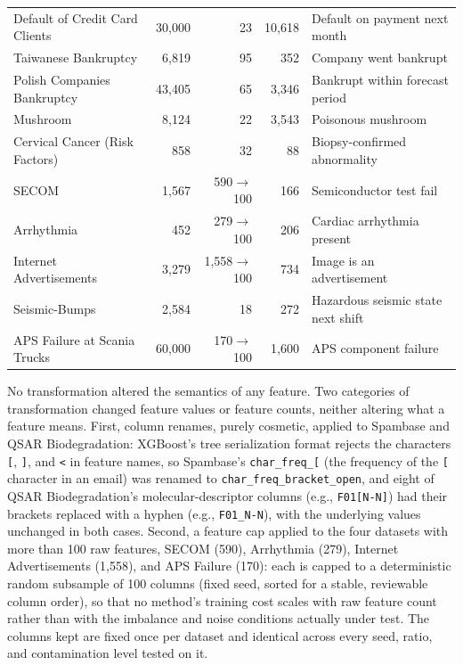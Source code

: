 \begin{table}[t]
\begin{tabular}{@{}lrrrl@{}}
Default of Credit Card Clients & 30{,}000 & 23 & 10{,}618 & Default on payment next month \\
Taiwanese Bankruptcy           & 6{,}819  & 95 & 352    & Company went bankrupt \\
Polish Companies Bankruptcy    & 43{,}405 & 65 & 3{,}346  & Bankrupt within forecast period \\
Mushroom                       & 8{,}124  & 22 & 3{,}543  & Poisonous mushroom \\
Cervical Cancer (Risk Factors) & 858     & 32 & 88     & Biopsy-confirmed abnormality \\
SECOM                          & 1{,}567  & 590$\to$100 & 166 & Semiconductor test fail \\
Arrhythmia                     & 452     & 279$\to$100 & 206 & Cardiac arrhythmia present \\
Internet Advertisements        & 3{,}279  & 1{,}558$\to$100 & 734 & Image is an advertisement \\
Seismic-Bumps                  & 2{,}584  & 18 & 272    & Hazardous seismic state next shift \\
APS Failure at Scania Trucks   & 60{,}000 & 170$\to$100 & 1{,}600 & APS component failure \\
\bottomrule
\end{tabular}
\end{table}

No transformation altered the semantics of any feature. Two categories of
transformation changed feature values or feature counts, neither altering
what a feature means. First, column renames, purely cosmetic, applied to
Spambase and QSAR Biodegradation: XGBoost's tree serialization format
rejects the characters \texttt{[}, \texttt{]}, and \texttt{<} in feature
names, so Spambase's \texttt{char\_freq\_[} (the frequency of the
\texttt{[} character in an email) was renamed to
\texttt{char\_freq\_bracket\_open}, and eight of QSAR Biodegradation's
molecular-descriptor columns (e.g., \texttt{F01[N-N]}) had their brackets
replaced with a hyphen (e.g., \texttt{F01\_N-N}), with the underlying values
unchanged in both cases. Second, a feature cap applied to the four datasets
with more than 100 raw features, SECOM (590), Arrhythmia (279), Internet
Advertisements (1{,}558), and APS Failure (170): each is capped to a
deterministic random subsample of 100 columns (fixed seed, sorted for a
stable, reviewable column order), so that no method's training cost scales
with raw feature count rather than with the imbalance and noise conditions
actually under test. The columns kept are fixed once per dataset and
identical across every seed, ratio, and contamination level tested on it.

